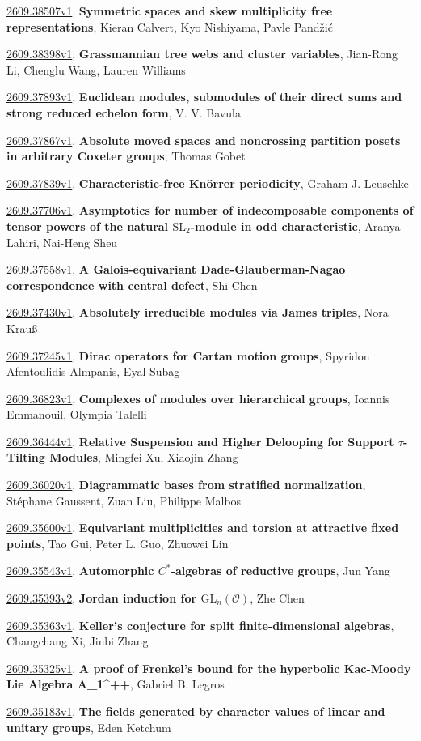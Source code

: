 \documentclass[9pt, a4paper]{article}
\theoremstyle{plain}
\theoremstyle{definition}
\theoremstyle{remark}
\newcommand{\arxiv}[3]{\href{https://arxiv.org/abs/#1}{#1}, \textbf{\textcolor{arxivblue}{#2}}, #3}
\begin{document}
\arxiv{2609.38507v1}{Symmetric spaces and skew multiplicity free representations}{Kieran Calvert, Kyo Nishiyama, Pavle Pandžić}

\arxiv{2609.38398v1}{Grassmannian tree webs and cluster variables}{Jian-Rong Li, Chenglu Wang, Lauren Williams}

\arxiv{2609.37893v1}{Euclidean modules, submodules of their direct sums and strong reduced echelon form}{V. V. Bavula}

\arxiv{2609.37867v1}{Absolute moved spaces and noncrossing partition posets in arbitrary Coxeter groups}{Thomas Gobet}

\arxiv{2609.37839v1}{Characteristic-free Knörrer periodicity}{Graham J. Leuschke}

\arxiv{2609.37706v1}{Asymptotics for number of indecomposable components of tensor powers of the natural $\mathrm{SL}_2$-module in odd characteristic}{Aranya Lahiri, Nai-Heng Sheu}

\arxiv{2609.37558v1}{A Galois-equivariant Dade-Glauberman-Nagao correspondence with central defect}{Shi Chen}

\arxiv{2609.37430v1}{Absolutely irreducible modules via James triples}{Nora Krauß}

\arxiv{2609.37245v1}{Dirac operators for Cartan motion groups}{Spyridon Afentoulidis-Almpanis, Eyal Subag}

\arxiv{2609.36823v1}{Complexes of modules over hierarchical groups}{Ioannis Emmanouil, Olympia Talelli}

\arxiv{2609.36444v1}{Relative Suspension and Higher Delooping for Support $τ$-Tilting Modules}{Mingfei Xu, Xiaojin Zhang}

\arxiv{2609.36020v1}{Diagrammatic bases from stratified normalization}{Stéphane Gaussent, Zuan Liu, Philippe Malbos}

\arxiv{2609.35600v1}{Equivariant multiplicities and torsion at attractive fixed points}{Tao Gui, Peter L. Guo, Zhuowei Lin}

\arxiv{2609.35543v1}{Automorphic $C^*$-algebras of reductive groups}{Jun Yang}

\arxiv{2609.35393v2}{Jordan induction for $\mathrm{GL}_n(\mathcal{O})$}{Zhe Chen}

\arxiv{2609.35363v1}{Keller's conjecture for split finite-dimensional algebras}{Changchang Xi, Jinbi Zhang}

\arxiv{2609.35325v1}{A proof of Frenkel's bound for the hyperbolic Kac-Moody Lie Algebra A_1^++}{Gabriel B. Legros}

\arxiv{2609.35183v1}{The fields generated by character values of linear and unitary groups}{Eden Ketchum}
\end{document}
